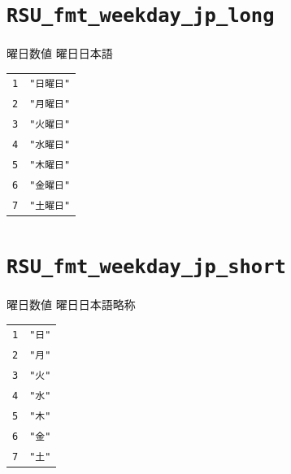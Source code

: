 \section{\texttt{RSU\_fmt\_weekday\_jp\_long}}
\paragraph{\DocStrTitleRDMPredefinedFormatConversion}曜日数値  曜日日本語
\begin{center}
\begin{xltabular}{\textwidth}{|p{7truecm}|X|}
\hline
\thead{\DocStrHeaderFormatInput}&\thead{\DocStrHeaderFormatOutput}\\
\hline
\hline
\texttt{1}&\texttt{"日曜日"}\\
\hline
\texttt{2}&\texttt{"月曜日"}\\
\hline
\texttt{3}&\texttt{"火曜日"}\\
\hline
\texttt{4}&\texttt{"水曜日"}\\
\hline
\texttt{5}&\texttt{"木曜日"}\\
\hline
\texttt{6}&\texttt{"金曜日"}\\
\hline
\texttt{7}&\texttt{"土曜日"}\\
\hline
\end{xltabular}
\end{center}
\section{\texttt{RSU\_fmt\_weekday\_jp\_short}}
\paragraph{\DocStrTitleRDMPredefinedFormatConversion}曜日数値  曜日日本語略称
\begin{center}
\begin{xltabular}{\textwidth}{|p{7truecm}|X|}
\hline
\thead{\DocStrHeaderFormatInput}&\thead{\DocStrHeaderFormatOutput}\\
\hline
\hline
\texttt{1}&\texttt{"日"}\\
\hline
\texttt{2}&\texttt{"月"}\\
\hline
\texttt{3}&\texttt{"火"}\\
\hline
\texttt{4}&\texttt{"水"}\\
\hline
\texttt{5}&\texttt{"木"}\\
\hline
\texttt{6}&\texttt{"金"}\\
\hline
\texttt{7}&\texttt{"土"}\\
\hline
\end{xltabular}
\end{center}
 
